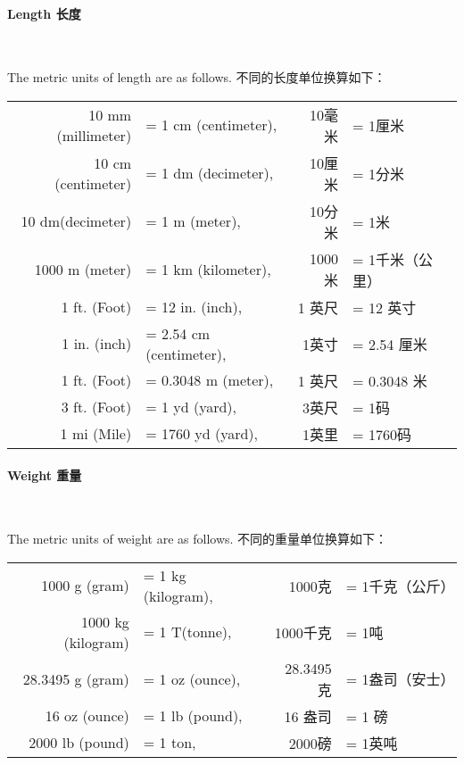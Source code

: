 \paragraph{Length 长度}
\ \\ 
\begin{paracol}{2}
The metric units of length are as follows.
\switchcolumn
不同的长度单位换算如下：
\end{paracol}

\begin{table}[!hbtp]
\begin{center}
\begin{tabular}{rlrl}
10 mm (millimeter) &= 1 cm (centimeter), & 10毫米 &= 1厘米\\
10 cm (centimeter) &= 1 dm (decimeter), & 10厘米 &= 1分米\\
10 dm(decimeter) &= 1 m (meter), &  10分米 &= 1米\\
1000 m (meter) &= 1 km (kilometer), & 1000米 &= 1千米（公里）\\
1 ft. (Foot) &= 12 in. (inch), & 1 英尺 &= 12 英寸\\
1 in. (inch) &= 2.54 cm (centimeter), & 1英寸 &= 2.54 厘米\\
1 ft. (Foot) &= 0.3048 m (meter), & 1 英尺 &= 0.3048 米\\
3 ft. (Foot) &= 1 yd (yard), & 3英尺 &= 1码\\
1 mi (Mile) &= 1760 yd (yard), & 1英里 &= 1760码
\end{tabular}
\end{center}
\end{table}

\paragraph{Weight 重量}
\ \\ 

\begin{paracol}{2}
The metric units of weight are as follows.
\switchcolumn
不同的重量单位换算如下：
\end{paracol}

\begin{table}[!hbtp]
\begin{center}
\begin{tabular}{rlrl}
1000 g (gram) &= 1 kg (kilogram), & 1000克 &= 1千克（公斤）\\
1000 kg (kilogram) &= 1 T(tonne), & 1000千克 &= 1吨\\
28.3495 g (gram) &= 1 oz (ounce), & 28.3495克 &= 1盎司（安士）\\
16 oz (ounce) &= 1 lb (pound), & 16 盎司 &= 1 磅\\
2000 lb (pound) &= 1 ton, & 2000磅 &= 1英吨
\end{tabular}
\end{center}
\end{table}

